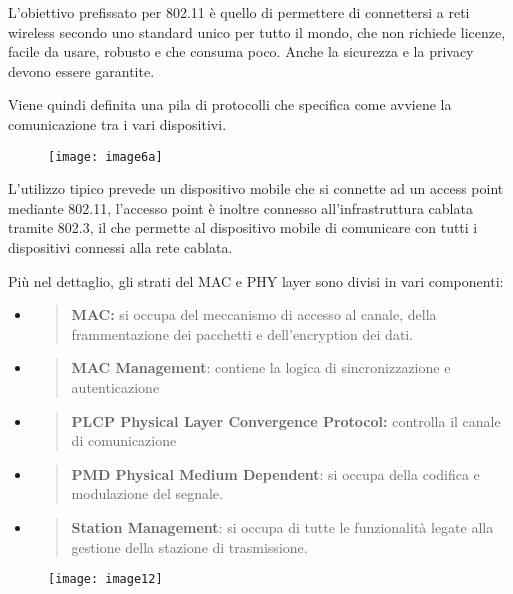 L'obiettivo prefissato per 802.11 è quello di permettere di connettersi
a reti wireless secondo uno standard unico per tutto il mondo, che non
richiede licenze, facile da usare, robusto e che consuma poco. Anche la sicurezza
e la privacy devono essere garantite.

Viene quindi definita una pila di protocolli che specifica come avviene
la comunicazione tra i vari dispositivi.

\begin{figure}[H]
  \centering
  \texttt{[image: image6a]}
\end{figure}

L'utilizzo tipico prevede un dispositivo mobile che si connette ad un
access point mediante 802.11, l'accesso point è inoltre connesso
all'infrastruttura cablata tramite 802.3, il che permette al dispositivo
mobile di comunicare con tutti i dispositivi connessi alla rete cablata.

Più nel dettaglio, gli strati del MAC e PHY layer sono divisi in vari
componenti:

\begin{itemize}
\item
  \begin{quote}
  \textbf{MAC:} si occupa del meccanismo di accesso al canale, della
  frammentazione dei pacchetti e dell'encryption dei dati.
  \end{quote}
\item
  \begin{quote}
  \textbf{MAC Management}: contiene la logica di sincronizzazione e
  autenticazione
  \end{quote}
\item
  \begin{quote}
  \textbf{PLCP Physical Layer Convergence Protocol:} controlla il canale
  di comunicazione
  \end{quote}
\item
  \begin{quote}
  \textbf{PMD Physical Medium Dependent}: si occupa della codifica e
  modulazione del segnale.
  \end{quote}
\item
  \begin{quote}
  \textbf{Station Management}: si occupa di tutte le funzionalità legate
  alla gestione della stazione di trasmissione.
  \end{quote}
\end{itemize}

\begin{figure}[H]
  \centering
  \texttt{[image: image12]}
\end{figure}

